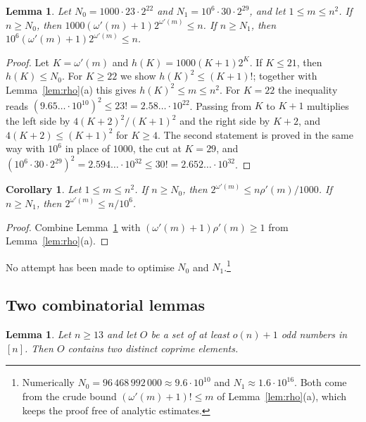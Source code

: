 \documentclass[11pt,a4paper]{article}
\newtheorem{lemma}[theorem]{Lemma}
\newtheorem{corollary}[theorem]{Corollary}
\theoremstyle{definition}
\theoremstyle{remark}
\begin{document}
\begin{lemma}\label{lem:large}
Let $N_0=1000\cdot23\cdot2^{22}$ and $N_1=10^6\cdot30\cdot2^{29}$, and let $1\le m\le
n^2$. If
$n\ge N_0$, then $1000(\omega'(m)+1)2^{\omega'(m)}\le n$. If $n\ge N_1$, then
$10^6(\omega'(m)+1)2^{\omega'(m)}\le n$.
\end{lemma}

\begin{proof}
Let $K=\omega'(m)$ and $h(K)=1000(K+1)2^K$. If $K\le 21$, then $h(K)\le N_0$. For $K\ge22$ we show
$h(K)^2\le(K+1)!$; together with Lemma~\ref{lem:rho}(a) this gives $h(K)^2\le m\le n^2$. For $K=22$
the inequality reads $(9.65\ldots\cdot10^{10})^2\le23!=2.58\ldots\cdot10^{22}$. Passing from $K$ to
$K+1$ multiplies the left side by $4(K+2)^2/(K+1)^2$ and the right side by $K+2$, and
$4(K+2)\le(K+1)^2$ for $K\ge4$. The second statement is proved in the same way with $10^6$ in place
of $1000$, the cut at $K=29$, and $(10^6\cdot30\cdot2^{29})^2=2.594\ldots\cdot10^{32}\le30!
=2.652\ldots\cdot10^{32}$.
\end{proof}

\begin{corollary}\label{cor:large}
Let $1\le m\le n^2$. If $n\ge N_0$, then $2^{\omega'(m)}\le n\rho'(m)/1000$. If $n\ge N_1$, then
$2^{\omega'(m)}\le n/10^6$.
\end{corollary}

\begin{proof}
Combine Lemma~\ref{lem:large} with $(\omega'(m)+1)\rho'(m)\ge1$ from Lemma~\ref{lem:rho}(a).
\end{proof}

No attempt has been made to optimise $N_0$ and $N_1$.\footnote{Numerically
$N_0=96\,468\,992\,000\approx9.6\cdot10^{10}$ and $N_1\approx1.6\cdot10^{16}$. Both come from the crude
bound $(\omega'(m)+1)!\le m$ of Lemma~\ref{lem:rho}(a), which keeps the proof free of analytic
estimates.}

\subsection{Two combinatorial lemmas}

\begin{lemma}\label{lem:pair}
Let $n\ge13$ and let $O$ be a set of at least $o(n)+1$ odd numbers in $[n]$. Then $O$ contains two
distinct coprime elements.
\end{lemma}
\end{document}
